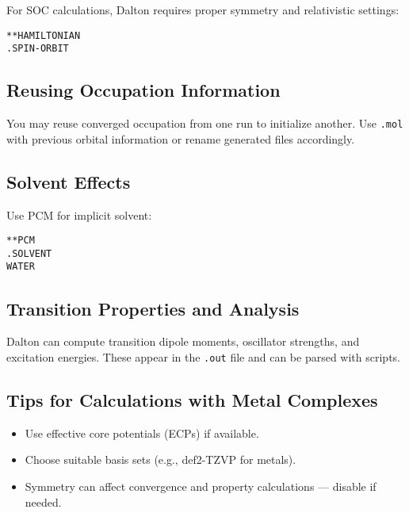For SOC calculations, Dalton requires proper symmetry and relativistic settings:

\begin{verbatim}
**HAMILTONIAN
.SPIN-ORBIT
\end{verbatim}

\subsection*{Reusing Occupation Information}

You may reuse converged occupation from one run to initialize another. Use \texttt{.mol} with previous orbital information or rename generated files accordingly.

\subsection*{Solvent Effects}

Use PCM for implicit solvent:

\begin{verbatim}
**PCM
.SOLVENT
WATER
\end{verbatim}

\subsection*{Transition Properties and Analysis}

Dalton can compute transition dipole moments, oscillator strengths, and excitation energies. These appear in the \texttt{.out} file and can be parsed with scripts.

\subsection*{Tips for Calculations with Metal Complexes}

\begin{itemize}
  \item Use effective core potentials (ECPs) if available.
  \item Choose suitable basis sets (e.g., def2-TZVP for metals).
  \item Symmetry can affect convergence and property calculations — disable if needed.
\end{itemize}
